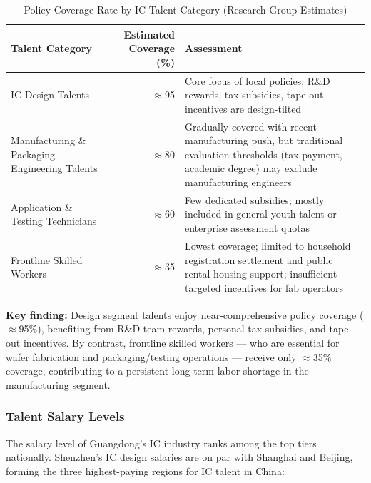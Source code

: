 \documentclass[12pt,a4paper]{article}
\newcommand{\tableHeaderRow}{\rowcolor{tealPrimary}\color{white}}
\newcommand{\tableOddRow}{\rowcolor{mintBG}}
\newcommand{\tableEvenRow}{\rowcolor{white}}
\begin{document}
\begin{table}[H]
\centering
\caption{Policy Coverage Rate by IC Talent Category (Research Group Estimates)}
\label{tab:policy_coverage}
\begin{tabular}{p{3.5cm}rp{7.5cm}}
\toprule
\tableHeaderRow
\textbf{Talent Category} & \textbf{Estimated Coverage (\%)} & \textbf{Assessment} \\
\midrule
\tableOddRow  IC Design Talents & $\approx$95 & Core focus of local policies; R\&D rewards, tax subsidies, tape-out incentives are design-tilted \\
\tableEvenRow Manufacturing \& Packaging Engineering Talents & $\approx$80 & Gradually covered with recent manufacturing push, but traditional evaluation thresholds (tax payment, academic degree) may exclude manufacturing engineers \\
\tableOddRow  Application \& Testing Technicians & $\approx$60 & Few dedicated subsidies; mostly included in general youth talent or enterprise assessment quotas \\
\tableEvenRow Frontline Skilled Workers & $\approx$35 & Lowest coverage; limited to household registration settlement and public rental housing support; insufficient targeted incentives for fab operators \\
\bottomrule
\end{tabular}
\end{table}

\textbf{Key finding:} Design segment talents enjoy near-comprehensive policy
coverage ($\approx$95\%), benefiting from R\&D team rewards, personal tax
subsidies, and tape-out incentives. By contrast, frontline skilled workers —
who are essential for wafer fabrication and packaging/testing operations —
receive only $\approx$35\% coverage, contributing to a persistent long-term
labor shortage in the manufacturing segment.

\subsubsection{Talent Salary Levels}

The salary level of Guangdong's IC industry ranks among the top tiers
nationally. Shenzhen's IC design salaries are on par with Shanghai and
Beijing, forming the three highest-paying regions for IC talent in China:
\end{document}
